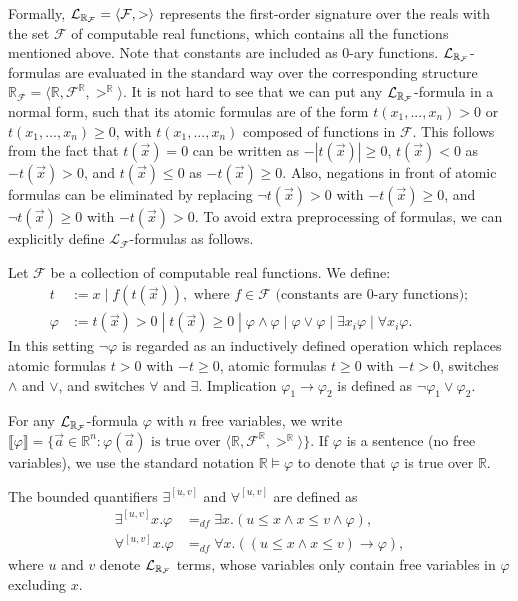 \documentclass[12pt]{article}
\begin{document}
Formally, $\mathcal{L}_{\mathbb{R}_{\mathcal{F}}} = \langle \mathcal{F}, > \rangle$ represents the first-order signature over the reals with the set $\mathcal{F}$ of computable real functions, which contains all the functions mentioned above. Note that constants are included as 0-ary functions. $\mathcal{L}_{\mathbb{R}_{\mathcal{F}}}$-formulas are evaluated in the standard way over the corresponding structure $\mathbb{R}_{\mathcal{F}}= \langle \mathbb{R}, \mathcal{F}^{\mathbb{R}}, >^{\mathbb{R}}\rangle$. It is not hard to see that we can put any $\mathcal{L}_{\mathbb{R}_{\mathcal{F}}}$-formula in a normal form, such that its atomic formulas are of the form $t(x_1,...,x_n)>0$ or $t(x_1,...,x_n)\geq 0$, with $t(x_1,...,x_n)$ composed of functions in $\mathcal{F}$. This follows from the fact that $t(\vec x)=0$ can be written as $-|t(\vec x)|\geq 0$, $t(\vec x)<0$ as $-t(\vec x)>0$, and $t(\vec x)\leq 0$ as $-t(\vec x)\geq 0$. Also, negations in front of atomic formulas can be eliminated by replacing $\neg t(\vec x) > 0$ with $-t(\vec x)\geq 0$, and $\neg t(\vec x)\geq 0$ with $-t(\vec x)>0$. To avoid extra preprocessing of formulas, we can explicitly define $\mathcal{L}_{\mathcal{F}}$-formulas as follows.
\begin{definition}
Let $\mathcal{F}$ be a collection of computable real functions. We define:
\begin{align*}
t& := x \; | \; f(t(\vec x)), \mbox{ where }f\in \mathcal{F} \mbox{ (constants are 0-ary functions)};\\
\varphi& := t(\vec x)> 0 \; | \; t(\vec x)\geq 0 \; | \; \varphi\wedge\varphi
\; | \; \varphi\vee\varphi \; | \; \exists x_i\varphi \; |\; \forall x_i\varphi.
\end{align*}
In this setting $\neg\varphi$ is regarded as an inductively defined operation
which replaces atomic formulas $t>0$ with $-t\geq 0$, atomic formulas $t\geq 0$
with $-t>0$, switches $\wedge$ and $\vee$, and switches $\forall$ and $\exists$.
Implication $\varphi_1\rightarrow\varphi_2$ is defined as $\neg\varphi_1\vee\varphi_2$.
\end{definition}
For any $\mathcal{L}_{\mathbb{R}_{\mathcal{F}}}$-formula $\varphi$ with $n$ free variables, we write $\llbracket \varphi\rrbracket = \{\vec a\in \mathbb{R}^n: \varphi(\vec a)\mbox{ is true over }\langle\mathbb{R},\mathcal{F}^{\mathbb{R}}, >^{\mathbb{R}}\rangle\}.$ If $\varphi$ is a sentence (no free variables), we use the standard notation $\mathbb{R}\models\varphi$ to denote that $\varphi$ is true over $\mathbb{R}$.
\begin{definition}
The bounded quantifiers $\exists^{[u,v]}$ and $\forall^{[u,v]}$ are defined as
\begin{align*}
\exists^{[u,v]}x.\varphi &=_{df}\exists x. ( u \leq x \land x \leq v \wedge
\varphi),\\
\forall^{[u,v]}x.\varphi &=_{df} \forall x. ( (u \leq x \land x \leq v)
\rightarrow \varphi),
\end{align*}
where $u$ and $v$ denote $\mathcal{L}_{\mathbb{R}_{\mathcal{F}}}$ terms, whose variables only
contain free variables in $\varphi$ excluding $x$. 
\end{definition}
\end{document}
